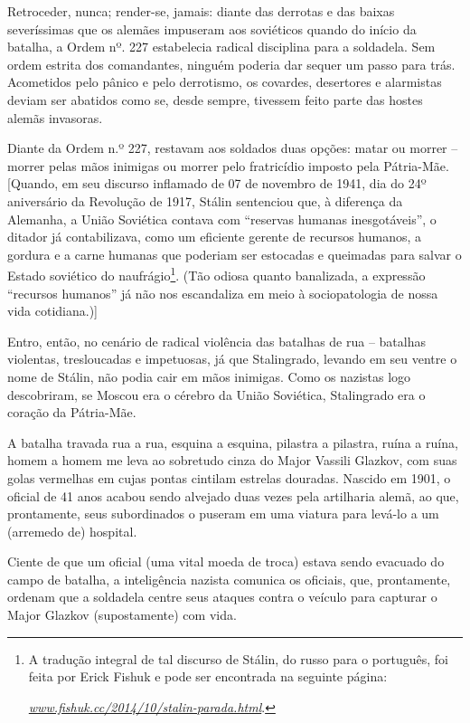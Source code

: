Retroceder, nunca; render-se, jamais: diante das derrotas e das baixas
severíssimas que os alemães impuseram aos soviéticos quando do início da
batalha, a Ordem nº. 227 estabelecia radical disciplina para a
soldadela. Sem ordem estrita dos comandantes, ninguém poderia dar sequer
um passo para trás. Acometidos pelo pânico e pelo derrotismo, os
covardes, desertores e alarmistas deviam ser abatidos como se, desde
sempre, tivessem feito parte das hostes alemãs invasoras.

Diante da Ordem n.º 227, restavam aos soldados duas opções: matar ou
morrer -- morrer pelas mãos inimigas ou morrer pelo fratricídio imposto
pela Pátria-Mãe. {[}Quando, em seu discurso inflamado de 07 de novembro
de 1941, dia do 24º aniversário da Revolução de 1917, Stálin sentenciou
que, à diferença da Alemanha, a União Soviética contava com ``reservas
humanas inesgotáveis'', o ditador já contabilizava, como um eficiente
gerente de recursos humanos, a gordura e a carne humanas que poderiam
ser estocadas e queimadas para salvar o Estado soviético do
naufrágio\footnote{A tradução integral de tal discurso de Stálin, do
  russo para o português, foi feita por Erick Fishuk e pode ser
  encontrada na seguinte página:

  \href{http://www.fishuk.cc/2014/10/stalin-parada.html}{\emph{www.fishuk.cc/2014/10/stalin-parada.html}}.}.
(Tão odiosa quanto banalizada, a expressão ``recursos humanos'' já não
nos escandaliza em meio à sociopatologia de nossa vida cotidiana.){]}

Entro, então, no cenário de radical violência das batalhas de rua --
batalhas violentas, tresloucadas e impetuosas, já que Stalingrado,
levando em seu ventre o nome de Stálin, não podia cair em mãos inimigas.
Como os nazistas logo descobriram, se Moscou era o cérebro da União
Soviética, Stalingrado era o coração da Pátria-Mãe.

A batalha travada rua a rua, esquina a esquina, pilastra a pilastra,
ruína a ruína, homem a homem me leva ao sobretudo cinza do Major Vassili
Glazkov, com suas golas vermelhas em cujas pontas cintilam estrelas
douradas. Nascido em 1901, o oficial de 41 anos acabou sendo alvejado
duas vezes pela artilharia alemã, ao que, prontamente, seus subordinados
o puseram em uma viatura para levá-lo a um (arremedo de) hospital.

Ciente de que um oficial (uma vital moeda de troca) estava sendo
evacuado do campo de batalha, a inteligência nazista comunica os
oficiais, que, prontamente, ordenam que a soldadela centre seus ataques
contra o veículo para capturar o Major Glazkov (supostamente) com vida.

